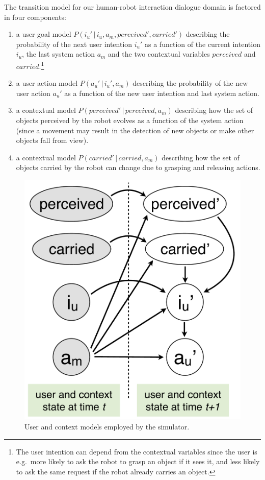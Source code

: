 The transition model for our human-robot interaction dialogue domain is factored in four components:
\begin{enumerate}
\item a user goal model $P(i_u' \, | \, i_u, a_m, \mathit{perceived}', \mathit{carried}')$ describing the probability of the next user intention $i_u'$ as a function of the current intention $i_u$, the last system action $a_m$ and the two contextual variables $\mathit{perceived}$ and $\mathit{carried}$.\footnote{The user intention can depend from the contextual variables since the user is e.g.\ more likely to ask the robot to grasp an object if it sees it, and less likely to ask the same request if the robot already carries an object.}
\item a user action model $P(a_u' \, | \, i_u', a_m)$ describing the probability of the new user action $a_u'$ as a function of the new user intention and last system action.
\item a contextual model $P(\mathit{perceived}' \, | \, \mathit{perceived}, a_m)$ describing how the set of objects perceived by the robot evolves as a function of the system action (since a movement may result in the detection of new objects or make other objects fall from view).
\item a contextual model $P(\mathit{carried}' \, | \, \mathit{carried}, a_m)$ describing how the set of objects carried by the robot can change due to grasping and releasing actions. 
\end{enumerate}

\begin{figure}
\vspace{-2mm}
\centering
\includegraphics[scale=0.25]{imgs/simulatormodels.pdf}
\caption{User and context models employed by the simulator.}
\label{fig:simulatormodels}
\end{figure}

